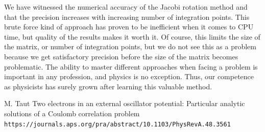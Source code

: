 \documentclass{article}
\begin{document}
We have witnessed the numerical accuracy of the Jacobi rotation method and that the precision increases with increasing number of integration points. This brute force kind of approach has proven to be inefficient when it comes to CPU time, but quality of the results makes it worth it. Of course, this limits the size of the matrix, or number of integration points, but we do not see this as a problem because we get satisfactory precision before the size of the matrix becomes problematic. The ability to master different approaches when facing a problem is important in any profession, and physics is no exception. Thus, our competence as physicists has surely grown after learning this valuable method. 


\begin{thebibliography}{}
M. Taut Two electrons in an external oscillator potential: Particular analytic solutions of a Coulomb correlation problem
\\\texttt{https://journals.aps.org/pra/abstract/10.1103/PhysRevA.48.3561}

\end{thebibliography}
\end{document}

